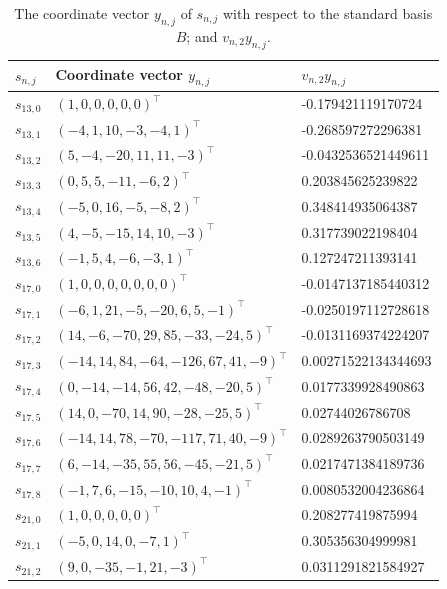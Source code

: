 \begin{table}[htbp]
\centering
\caption{The coordinate vector $y_{n,j}$ of $s_{n,j}$ with respect to the standard basis $B$; and $v_{n,2} {y}_{n,j}$. }
\label{tab:vectorrep}
\begin{tabular}{|l|l|l|}
\hline
\( s_{n,j} \) & Coordinate vector $y_{n,j}$ & \( v_{n,2} {y}_{n,j} \) \\
\hline
\( s_{13,0} \) & \( (1,0,0,0,0,0)^\top \) & -0.179421119170724 \\ \hline
\( s_{13,1} \) & \( (-4,1,10,-3,-4,1)^\top \)& -0.268597272296381 \\ \hline
\( s_{13,2} \) & \( (5,-4,-20,11,11,-3)^\top \) & -0.0432536521449611 \\ \hline
\( s_{13,3} \) & \( (0,5,5,-11,-6,2)^\top \) & 0.203845625239822 \\ \hline
\( s_{13,4} \) & \( (-5,0,16,-5,-8,2)^\top \) & 0.348414935064387 \\ \hline
\( s_{13,5} \) & \( (4,-5,-15,14,10,-3)^\top \) & 0.317739022198404 \\ \hline
\( s_{13,6} \) & \( (-1,5,4,-6,-3,1)^\top \) & 0.127247211393141 \\
\hline
\( s_{17,0} \) & \( (1,0,0,0,0,0,0,0)^\top \) & -0.0147137185440312 \\ \hline
\( s_{17,1} \) & \( (-6,1,21,-5,-20,6,5,-1)^\top \) & -0.0250197112728618 \\ \hline
\( s_{17,2} \) & \( (14,-6,-70,29,85,-33,-24,5)^\top \) & -0.0131169374224207 \\ \hline
\( s_{17,3} \) & \( (-14,14,84,-64,-126,67,41,-9)^\top \) & 0.00271522134344693 \\ \hline
\( s_{17,4} \) & \( (0,-14,-14,56,42,-48,-20,5)^\top \) & 0.0177339928490863 \\ \hline
\( s_{17,5} \) & \( (14,0,-70,14,90,-28,-25,5)^\top \) & 0.02744026786708 \\ \hline
\( s_{17,6} \) & \( (-14,14,78,-70,-117,71,40,-9)^\top \) & 0.0289263790503149 \\ \hline
\( s_{17,7} \) & \( (6,-14,-35,55,56,-45,-21,5)^\top \) & 0.0217471384189736 \\ \hline
\( s_{17,8} \) & \( (-1,7,6,-15,-10,10,4,-1)^\top \) & 0.0080532004236864 \\ 
\hline
\( s_{21,0} \) & \( (1,0,0,0,0,0)^\top \) & 0.208277419875994 \\ \hline
\( s_{21,1} \) & \( (-5,0,14,0,-7,1)^\top \) & 0.305356304999981 \\ \hline
\( s_{21,2} \) & \( (9,0,-35,-1,21,-3)^\top \) & 0.0311291821584927 \\ \hline

\end{tabular}
\end{table}
